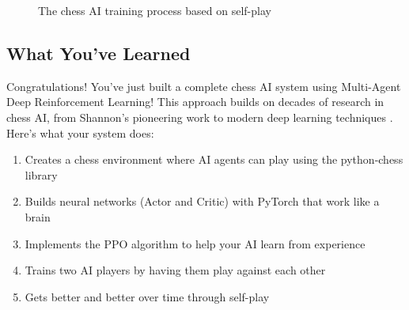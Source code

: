 \documentclass[11pt]{article}
\begin{document}
\begin{figure}[ht]
    \caption{The chess AI training process based on self-play}
    \label{fig:training_process}
\end{figure}

\subsection{What You've Learned}

Congratulations! You've just built a complete chess AI system using Multi-Agent Deep Reinforcement Learning! This approach builds on decades of research in chess AI, from Shannon's pioneering work \cite{shannon1950} to modern deep learning techniques \cite{silver2018}. Here's what your system does:

\begin{enumerate}
    \item Creates a chess environment where AI agents can play using the python-chess library \cite{python-chess}
    \item Builds neural networks (Actor and Critic) with PyTorch \cite{pytorch} that work like a brain
    \item Implements the PPO algorithm \cite{schulman2017} to help your AI learn from experience
    \item Trains two AI players by having them play against each other
    \item Gets better and better over time through self-play
\end{enumerate}


\end{document}
\end{tikzpicture}
\end{figure}
\end{document}
